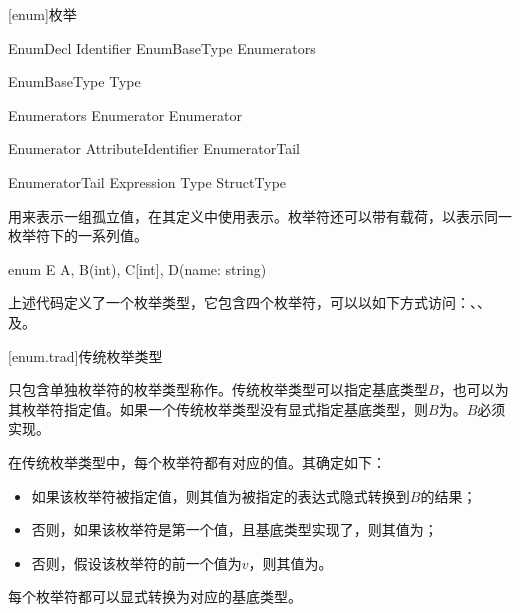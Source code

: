 
[enum]{枚举}

\begin{bnf}{EnumDecl}
     Identifier EnumBaseType\bnfq \terminal{\{} Enumerators \terminal{\}}
\end{bnf}

\begin{bnf}{EnumBaseType}
    \terminal{:} Type
\end{bnf}

\begin{bnf}{Enumerators}
    Enumerator \bnflp \terminal{,} Enumerator \bnfrp\bnfs \terminal{,}\bnfq
\end{bnf}

\begin{bnf}{Enumerator}
    Attribute\bnfq Identifier EnumeratorTail\bnfq
\end{bnf}

\begin{bnf}{EnumeratorTail}
    \terminal{=} Expression \br
    \terminal{[} Type \terminal{]} \br
    StructType
\end{bnf}

\pnum
{}用来表示一组孤立值，在其定义中使用表示。枚举符还可以带有载荷，以表示同一枚举符下的一系列值。

\enterexample
\begin{codeblock}

enum E {
    A,
    B(int),
    C[int],
    D(name: string)
}

\end{codeblock}

上述代码定义了一个枚举类型，它包含四个枚举符，可以以如下方式访问：、、及。
\exitexample

[enum.trad]{传统枚举类型}

\pnum
只包含单独枚举符的枚举类型称作。传统枚举类型可以指定基底类型$B$，也可以为其枚举符指定值。如果一个传统枚举类型没有显式指定基底类型，则$B$为。$B$必须实现。

\pnum
在传统枚举类型中，每个枚举符都有对应的值。其确定如下：

\begin{itemize}
    \item 如果该枚举符被指定值，则其值为被指定的表达式隐式转换到$B$的结果；
    \item 否则，如果该枚举符是第一个值，且基底类型实现了，则其值为；
    \item 否则，假设该枚举符的前一个值为$v$，则其值为。
\end{itemize}

每个枚举符都可以显式转换为对应的基底类型。